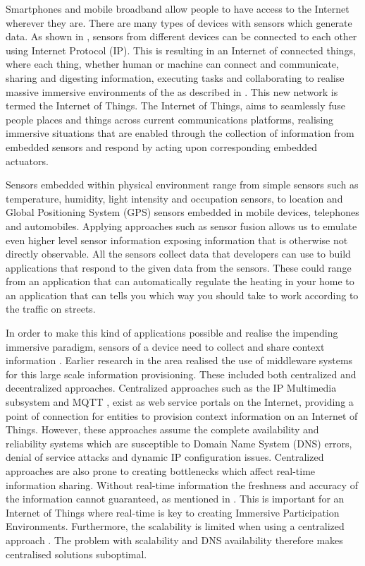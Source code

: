 Smartphones and mobile broadband allow people to have access to the Internet wherever they are. There are many types of devices with sensors which generate data. As shown in \cite{chui2010internet}, sensors from different devices can be connected to each other using Internet Protocol (IP). This is resulting in an Internet of connected things, where each thing, whether human or machine can connect and communicate, sharing and digesting information, executing tasks and collaborating to realise massive immersive environments of the as described in \cite{tan2010future}. This new network is termed the Internet of Things. The Internet of Things, aims to seamlessly fuse people places and things across current communications platforms, realising immersive situations that are enabled through the collection of information from embedded sensors and respond by acting upon corresponding embedded actuators. 

Sensors embedded within physical environment range from simple sensors such as temperature, humidity, light intensity and occupation sensors, to location and Global Positioning System (GPS) sensors embedded in mobile devices, telephones and automobiles. Applying approaches such as sensor fusion allows us to emulate even higher level sensor information exposing information that is otherwise not directly observable. All the sensors collect data that developers can use to build applications that respond to the given data from the sensors. These could range from an application that can automatically regulate the heating in your home to an application that can tells you which way you should take to work according to the traffic on streets.

In order to make this kind of applications possible and realise the impending immersive paradigm, sensors of a device need to collect and share context information \cite{dey2001understanding}. Earlier research in the area realised the use of middleware systems for this large scale information provisioning. These included both centralized and decentralized approaches. Centralized approaches such as the IP Multimedia subsystem \cite{Kardeby:2010:UMF:1845879.1846331} and MQTT \cite{HunkelerTS08}, exist as web service portals on the Internet, providing a point of connection for entities to provision context information on an Internet of Things. However, these approaches assume the complete availability and reliability systems which are susceptible to Domain Name System (DNS) errors, denial of service attacks and dynamic IP configuration issues. Centralized approaches are also prone to creating bottlenecks which affect real-time information sharing. Without real-time information the freshness and accuracy of the information cannot guaranteed, as mentioned in \cite{Walters437970}. This is important for an Internet of Things where real-time is key to creating Immersive Participation Environments. Furthermore, the scalability is limited when using a centralized approach \cite{Kanter539187}. The problem with scalability and DNS availability therefore makes centralised solutions suboptimal.


